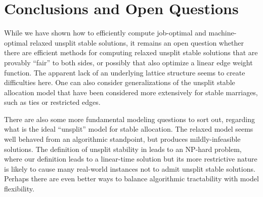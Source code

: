 \documentclass{llncs}
\begin{document}
\begin{center}
\end{center}



\section{Conclusions and Open Questions}
While we have shown how to efficiently compute job-optimal and
machine-optimal relaxed unsplit stable solutions, it remains an open
question whether there are efficient methods for computing relaxed
unsplit stable solutions that are provably ``fair'' to both sides, or
possibly that also optimize a linear edge weight function.  The
apparent lack of an underlying lattice structure seems to create
difficulties here.  One can also consider generalizations of the
unsplit stable allocation model that have been considered more
extensively for stable marriages, such as ties or restricted edges.

There are also some more fundamental modeling questions to sort out,
regarding what is the ideal ``unsplit'' model for stable allocation.
The relaxed model seems well behaved from an algorithmic standpoint,
but produces mildly-infeasible solutions.  The definition of unsplit
stability in \cite{DBLP:journals/jco/McDermidM10} leads to an NP-hard
problem, where our definition leads to a linear-time solution but its
more restrictive nature is likely to cause many real-world instances
not to admit unsplit stable solutions.  Perhaps there are even better
ways to balance algorithmic tractability with model flexibility.
\fi
\end{document}
